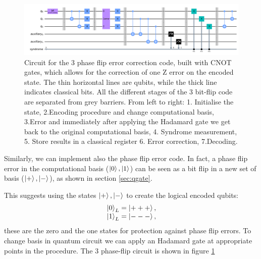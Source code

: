\begin{figure}[h!]
    \centering
    \includegraphics[width=\textwidth]{Mainmatter/images/3phaseflipcode.png}
    \caption{Circuit for the 3 phase flip error correction code, built with CNOT gates, which allows for the correction of one Z error on the encoded state. 
    The thin horizontal lines are qubits, while the thick line indicates classical bits. 
    All the different stages of the 3 bit-flip code are separated from grey barriers. From left to right: 1. Initialise the state, 2.Encoding procedure and change computational basis, 3.Error and immediately after applying the Hadamard gate we get back to the original computational basis, 4. Syndrome measurement, 5. Store results in a classical register 6. Error correction, 7.Decoding.}
    \label{fig:3phfc}
\end{figure}

Similarly, we can implement also the phase flip error code. In fact, a phase flip error in the computational basis ($\ket{0},\ket{1}$) can be seen as a bit flip in a new set of basis ($\ket{+},\ket{-}$), as shown in section \ref{sec:qgate}.

This suggests using the states $\ket{+},\ket{-}$ to create the logical encoded qubits: 
\begin{equation*}
    \begin{array}{c}
         \ket{0}_L=\ket{+++} ,\\
          \ket{1}_L=\ket{---},
    \end{array}
\end{equation*} these are the zero and the one states for protection against phase flip errors. 
To change basis in quantum circuit we can apply an Hadamard gate at appropriate points in the procedure.
The 3 phase-flip circuit is shown in figure \ref{fig:3phfc}



